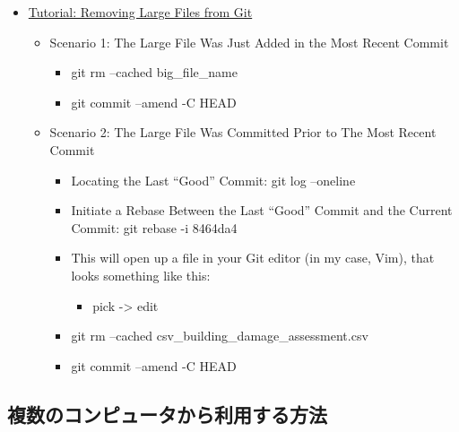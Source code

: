 \documentclass[
  xelatex, ja=standard]{bxjsbook}
\providecommand{\tightlist}{%
  \setlength{\itemsep}{0pt}\setlength{\parskip}{0pt}}
\theoremstyle{definition}
\theoremstyle{definition}
\theoremstyle{definition}
\theoremstyle{definition}
\theoremstyle{remark}
\begin{document}
\begin{itemize}
\tightlist
\item
  \href{https://medium.com/analytics-vidhya/tutorial-removing-large-files-from-git-78dbf4cf83a}{Tutorial: Removing Large Files from Git}

  \begin{itemize}
  \tightlist
  \item
    Scenario 1: The Large File Was Just Added in the Most Recent Commit

    \begin{itemize}
    \tightlist
    \item
      git rm --cached big\_file\_name
    \item
      git commit --amend -C HEAD
    \end{itemize}
  \item
    Scenario 2: The Large File Was Committed Prior to The Most Recent Commit

    \begin{itemize}
    \tightlist
    \item
      Locating the Last ``Good'' Commit: git log --oneline
    \item
      Initiate a Rebase Between the Last ``Good'' Commit and the Current Commit: git rebase -i 8464da4
    \item
      This will open up a file in your Git editor (in my case, Vim), that looks something like this:

      \begin{itemize}
      \tightlist
      \item
        pick -\textgreater{} edit
      \end{itemize}
    \item
      git rm --cached csv\_building\_damage\_assessment.csv
    \item
      git commit --amend -C HEAD
    \end{itemize}
  \end{itemize}
\end{itemize}

\hypertarget{ux8907ux6570ux306eux30b3ux30f3ux30d4ux30e5ux30fcux30bfux304bux3089ux5229ux7528ux3059ux308bux65b9ux6cd5}{%
\subsection{複数のコンピュータから利用する方法}\label{ux8907ux6570ux306eux30b3ux30f3ux30d4ux30e5ux30fcux30bfux304bux3089ux5229ux7528ux3059ux308bux65b9ux6cd5}}
\end{document}
